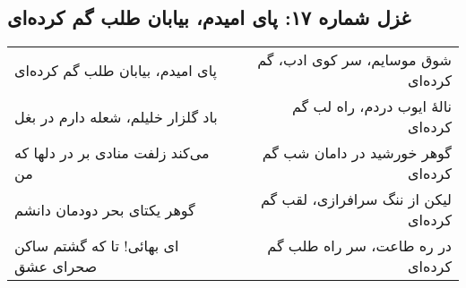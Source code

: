 \begin{center}
\section*{غزل شماره ۱۷: پای امیدم، بیابان طلب گم کرده‌ای}
\label{sec:017}
\begin{longtable}{l p{0.5cm} r}
پای امیدم، بیابان طلب گم کرده‌ای
&&
شوق موسایم، سر کوی ادب، گم کرده‌ای
\\
باد گلزار خلیلم، شعله دارم در بغل
&&
نالهٔ ایوب دردم، راه لب گم کرده‌ای
\\
می‌کند زلفت منادی بر در دلها که من
&&
گوهر خورشید در دامان شب گم کرده‌ای
\\
گوهر یکتای بحر دودمان دانشم
&&
لیکن از ننگ سرافرازی، لقب گم کرده‌ای
\\
ای بهائی! تا که گشتم ساکن صحرای عشق
&&
در ره طاعت، سر راه طلب گم کرده‌ای
\\
\end{longtable}
\end{center}
